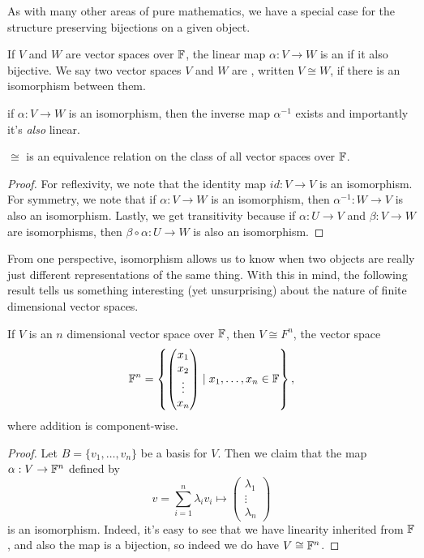 \documentclass[a4paper]{scrartcl}
\begin{document}
As with many other areas of pure mathematics, we have a special case for the structure preserving bijections on a given object.

\begin{definition}[Isomorphism]
    If $V$ and $W$ are vector spaces over $\mathbb{F}$, the linear map $\alpha: V \rightarrow W$ is an  if it also bijective. We say two vector spaces $V$ and $W$ are , written $V \cong W$, if there is an isomorphism between them.
\end{definition}

\begin{remark}
    if $\alpha:V \rightarrow W$ is an isomorphism, then the inverse map $\alpha^{-1}$ exists and importantly it's \emph{also} linear.
\end{remark}

\begin{lemma}
    $\cong$ is an equivalence relation on the class of all vector spaces over $\mathbb{F}$.
\end{lemma}
\begin{proof}
    For reflexivity, we note that the identity map $id: V \rightarrow V$ is an isomorphism. For symmetry, we note that if $\alpha: V \rightarrow W$ is an isomorphism, then $\alpha^{-1}: W \rightarrow V$ is also an isomorphism. Lastly, we get transitivity because if $\alpha: U \rightarrow V$ and $\beta: V \rightarrow W$ are isomorphisms, then $\beta \circ \alpha: U \rightarrow W$ is also an isomorphism.
\end{proof}

From one perspective, isomorphism allows us to know when two objects are really just different representations of the same thing. With this in mind, the following result tells us something interesting (yet unsurprising) about the nature of finite dimensional vector spaces.


\begin{theorem}
    If $V$ is an $n$ dimensional vector space over $\mathbb{F}$, then $V \cong F^n$, the vector space
    $$
    \mathbb{F}^n = \left\{\begin{pmatrix}x_1 \\ x_2 \\ \vdots \\ x_n\end{pmatrix} \mid x_1, \dots, x_n \in \mathbb{F} \right\},
    $$
    where addition is component-wise.
\end{theorem}
\begin{proof}
    Let $B = \{v_1, \dots, v_n\}$ be a basis for $V$. Then we claim that the map $\alpha: V \rightarrow \mathbb{F}^n$ defined by 
    $$
    v = \sum_{i = 1}^n \lambda_i v_i \longmapsto \begin{pmatrix}\lambda_1 \\ \vdots \\ \lambda_n\end{pmatrix}
    $$
    is an isomorphism. Indeed, it's easy to see that we have linearity inherited from $\mathbb{F}$, and also the map is a bijection, so indeed we do have $V \cong \mathbb{F}^n$.
\end{proof}
\end{document}
